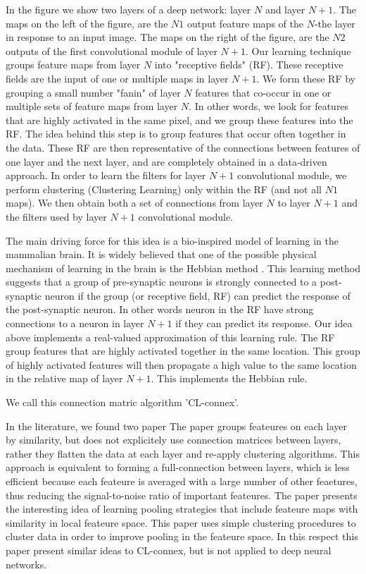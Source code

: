 \documentclass{article} %
\begin{document}
In the figure we show two layers of a deep network: layer $N$ and layer $N+1$. The maps on the left of the figure, are the $N1$ output feature maps of the $N$-the layer in response to an input image. The maps on the right of the figure, are the $N2$ outputs of the first convolutional module of layer $N+1$. 
Our learning technique groups feature maps from layer $N$ into "receptive fields" (RF). These receptive fields are the input of one or multiple maps in layer $N+1$. We form these RF by grouping a small number "fanin" of layer $N$ features that co-occur in one or multiple sets of feature maps from layer $N$. In other words, we look for features that are highly activated in the same pixel, and we group these features into the RF. The idea behind this step is to group features that occur often together in the data. These RF are then representative of the connections between features of one layer and the next layer, and are completely obtained in a data-driven approach.
In order to learn the filters for layer $N+1$ convolutional module, we perform clustering (Clustering Learning) only within the RF (and not all $N1$ maps). 
We then obtain both a set of connections from layer $N$ to layer $N+1$ and the filters used by layer $N+1$ convolutional module.

The main driving force for this idea is a bio-inspired model of learning in the mammalian brain. It is widely believed that one of the possible physical mechanism of learning in the brain is the Hebbian method \cite{masquelier2007learning}. This learning method suggests that a group of pre-synaptic neurons is strongly connected to a post-synaptic neuron if the group (or receptive field, RF) can predict the response of the post-synaptic neuron. In other words neuron in the RF have strong connections to a neuron in layer $N+1$ if they can predict its response. Our idea above implements a real-valued approximation of this learning rule. The RF group features that are highly activated together in the same location. This group of highly activated features will then propagate a high value to the same location in the relative map of layer $N+1$. This implements the Hebbian rule.

We call this connection matric algorithm 'CL-connex'.

In the literature, we found two paper 
The paper \cite{coates2012learning} groups feateures on each layer by similarity, but does not explicitely use connection matrices between layers, rather they flatten the data at each layer and re-apply clustering algorithms. This approach is equivalent to forming a full-connection between layers, which is less efficient because each feateure is averaged with a large number of other feaetures, thus reducing the signal-to-noise ratio of important feateures.
The paper \cite{boureau_2011} presents the interesting idea of learning pooling strategies that include feateure maps with similarity in local feateure space. This paper uses simple clustering procedures to cluster data in order to improve pooling in the feateure space. In this respect this paper present similar ideas to CL-connex, but is not applied to deep neural networks.
\end{document}

